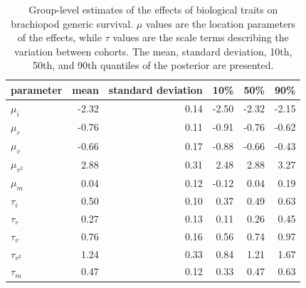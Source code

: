\documentclass{article}
\begin{document}
\begin{table}
  \centering
  \caption{Group-level estimates of the effects of biological traits on brachiopod generic survival. \(\mu\) values are the location parameters of the effects, while \(\tau\) values are the scale terms describing the variation between cohorts. The mean, standard deviation, 10th, 50th, and 90th quantiles of the posterior are presented.}
  \begin{tabular}{ l r r r r r }
    \hline
    parameter & mean & standard deviation & 10\% & 50\% & 90\% \\ 
    \hline
    \(\mu_{i}\) & -2.32 & 0.14 & -2.50 & -2.32 & -2.15 \\ 
    \(\mu_{r}\) & -0.76 & 0.11 & -0.91 & -0.76 & -0.62 \\ 
    \(\mu_{v}\) & -0.66 & 0.17 & -0.88 & -0.66 & -0.43 \\ 
    \(\mu_{v^{2}}\) & 2.88 & 0.31 & 2.48 & 2.88 & 3.27 \\ 
    \(\mu_{m}\) & 0.04 & 0.12 & -0.12 & 0.04 & 0.19 \\ 
    \(\tau_{i}\) & 0.50 & 0.10 & 0.37 & 0.49 & 0.63 \\ 
    \(\tau_{r}\) & 0.27 & 0.13 & 0.11 & 0.26 & 0.45 \\ 
    \(\tau_{v}\) & 0.76 & 0.16 & 0.56 & 0.74 & 0.97 \\ 
    \(\tau_{v^{2}}\) & 1.24 & 0.33 & 0.84 & 1.21 & 1.67 \\ 
    \(\tau_{m}\) & 0.47 & 0.12 & 0.33 & 0.47 & 0.63 \\ 
    \hline
  \end{tabular}
  \label{tab:param}
\end{table}
\end{document}

